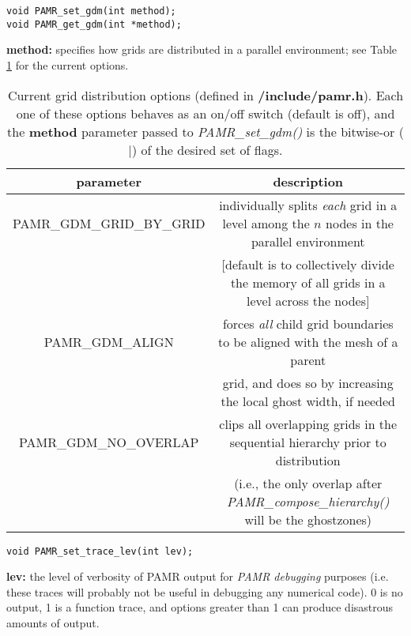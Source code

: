 \documentclass[aps,amssymb,unsortedaddress,nofootinbib]{revtex4}
\def\lsep{\itemsep 0.05in}
\begin{document}

\begin{verbatim}
void PAMR_set_gdm(int method);
void PAMR_get_gdm(int *method);
\end{verbatim}
\begin{list}{}{\lsep}
\item {\bf method:} specifies how grids are distributed in a parallel environment; see 
                    Table \ref{tab_gdm_ops} for the current options.
\end{list}

\begin{table}
\begin{center}
\begin{tabular}[t]{| c || c |}
\hline
parameter & description \\
\hline
\hline
PAMR\_GDM\_GRID\_BY\_GRID  & individually splits {\em each} grid in a level among the $n$ nodes in 
                             the parallel environment \\ 
                           & [default is to collectively divide
                             the memory of all grids in a level across the nodes] \\
PAMR\_GDM\_ALIGN           & forces {\em all} child grid boundaries to be aligned with the mesh of a parent \\
                           & grid, and does so by increasing the local ghost width, if needed\\
PAMR\_GDM\_NO\_OVERLAP     & clips all overlapping grids in the sequential hierarchy prior to distribution \\
                           & (i.e., the only overlap after
                             {\em PAMR\_compose\_hierarchy()} will be the ghostzones)\\
\hline
\end{tabular}
\end{center}
\caption
{ Current grid distribution options (defined in {\bf /include/pamr.h}). Each one
of these options behaves as an on/off switch (default is off), and the {\bf method}
parameter passed to {\em PAMR\_set\_gdm()} is the bitwise-or ($|$) of the desired
set of flags.
\label{tab_gdm_ops}}
\end{table}


\begin{verbatim}
void PAMR_set_trace_lev(int lev);
\end{verbatim}
\begin{list}{}{\lsep}
\item {\bf lev:} the level of verbosity of PAMR output for {\em PAMR debugging} 
                 purposes (i.e. these traces will probably not be useful in debugging
                 any numerical code). 0 is no output, 1 is a function trace, and
                 options greater than 1 can produce disastrous amounts of output.
\end{list}
\end{document}
